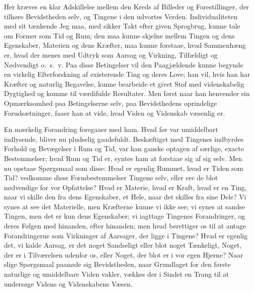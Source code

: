 \documentclass[12pt]{book}
\newcommand{\apage}[1]{\marginnote{\footnotesize\textit{[#1]}}}
\begin{document}
Her kræves en klar Adskillelse mellem den Kreds af Billeder og
Forestillinger, der tilhøre Bevidstheden selv, og Tingene i den udvortes
Verden. Individualiteten med sit tænkende Jeg maa, med sikker Takt efter
given Sprogbrug, kunne tale om Former som Tid og Rum; den maa kunne
skjelne mellem Tingen og dens Egenskaber, Materien og dens Kræfter, maa
kunne forstaae, hvad Sammenhæng er, hvad der menes med Udtryk som Aarsag
og Virkning, Tilfældigt og Nødvendigt o.\ s.\ v. Paa disse Betingelser vil
den  \apage{3} Paagjældende kunne begynde en virkelig Efterforskning af existerende
Ting og deres Love; han vil, hvis han har Kræfter og naturlig Begavelse,
kunne bearbeide et givet Stof med videnskabelig Dygtighed og komme til
værdifulde Resultater. Men først naar han henvender sin Opmærksomhed paa
Betingelserne selv, paa Bevidsthedens oprindelige Forudsætninger, faaer
han at vide, hvad Viden og Videnskab væsenlig er.

En mærkelig Forandring foregaaer med ham. Hvad før var umiddelbart
indlysende, bliver nu pludselig gaadefuldt. Beskæftiget med Tingenes
indbyrdes Forhold og Bevægelser i Rum og Tid, var han ganske optagen af
særlige, exacte Bestemmelser; hvad Rum og Tid er, syntes ham at forstaae
sig af sig selv. Men nu opstaae Spørgsmaal som disse: Hvad er egenlig
Rummet, hvad er Tiden som Tid? vedkomme disse Formbestemmelser Tingene
selv, eller ere de blot nødvendige for vor Opfattelse? Hvad er Materie,
hvad er Kraft, hvad er en Ting, naar vi skille den fra dens Egenskaber,
et Hele, naar det skilles fra sine Dele? Vi synes at see det Materielle,
men Kræfterne kunne vi ikke see; vi synes at sandse Tingen, men det er
kun dens Egenskaber; vi iagttage Tingenes Forandringer, og deres Følgen
med hinanden, efter hinanden; men hvad berettiger os til at antage
Forandringerne som Virkninger af Aarsager, der ligge i Tingene? Hvad er
egenlig det, vi kalde Aarsag, er det noget Sandseligt eller blot noget
Tænkeligt, Noget, der er i Tilværelsen udenfor os, eller Noget, der blot
er i vor egen Hjerne? Naar slige Spørgsmaal paanøde sig  \apage{4} Bevidstheden,
naar Grundlaget for den første naturlige og umiddelbare Viden vakler,
vækkes der i Sindet en Trang til at undersøge Videns og Videnskabens
Væsen.
\end{document}
